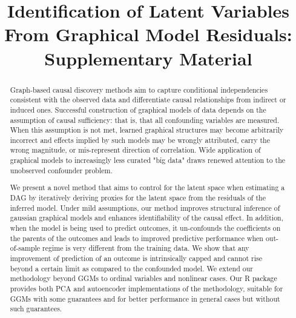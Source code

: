 \documentclass{article}
\title{Identification of Latent Variables From Graphical Model Residuals: Supplementary Material}
\begin{document}
\maketitle

\begin{abstract}
Graph-based causal discovery methods aim to capture conditional independencies consistent with the observed data and differentiate causal relationships from indirect or induced ones.  Successful construction of graphical models of data depends on the assumption of causal sufficiency: that is, that all confounding variables are measured. When this assumption is not met, learned graphical structures may become arbitrarily incorrect and effects implied by such models may be wrongly attributed, carry the wrong magnitude, or mis-represent direction of correlation.  Wide application of graphical models to increasingly less curated "big data" draws renewed attention to the unobserved confounder problem.  

We present a novel method that aims to control for the latent space when estimating a DAG by iteratively deriving proxies for the latent space from the residuals of the inferred model.  Under mild assumptions, our method improves structural inference of gaussian graphical models and enhances identifiability of the causal effect. In addition, when the model is being used to predict outcomes, it un-confounds the coefficients on the parents of the outcomes and leads to improved predictive performance when out-of-sample regime is very different from the training data.  We show that any improvement of prediction of an outcome is intrinsically capped and cannot rise beyond a certain limit as compared to the confounded model.  We extend our methodology beyond GGMs to ordinal variables and nonlinear cases.  Our R package provides both PCA and autoencoder implementations of the methodology, suitable for GGMs with some guarantees and for better performance in general cases but without such guarantees. 
\end{abstract}
\end{document}
